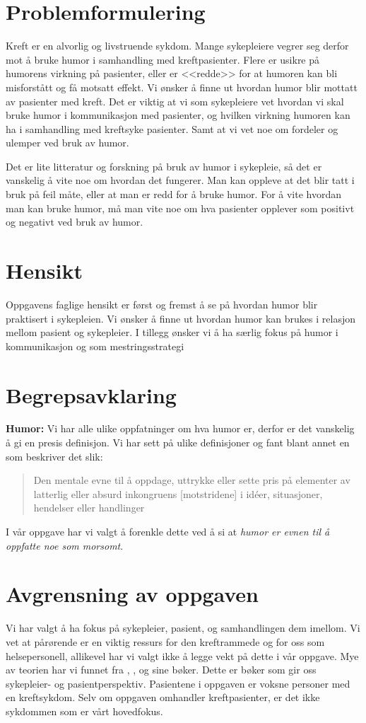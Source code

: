 \section{Problemformulering}

Kreft er en alvorlig og livstruende sykdom. Mange sykepleiere vegrer seg derfor
mot å bruke humor i samhandling med kreftpasienter. Flere er usikre på humorens
virkning på pasienter, eller er <<redde>> for at humoren kan bli misforstått og
få motsatt effekt. Vi ønsker å finne ut hvordan humor blir mottatt av pasienter
med kreft. Det er viktig at vi som sykepleiere vet hvordan vi skal bruke humor
i kommunikasjon med pasienter, og hvilken virkning humoren kan ha i samhandling
med kreftsyke pasienter. Samt at vi vet noe om fordeler og ulemper ved bruk av
humor.

Det er lite litteratur og forskning på bruk av humor i sykepleie, så det er
vanskelig å vite noe om hvordan det fungerer. Man kan oppleve at det blir tatt
i bruk på feil måte, eller at man er redd for å bruke humor. For å vite hvordan
man kan bruke humor, må man vite noe om hva pasienter opplever som positivt og
negativt ved bruk av humor.

\section{Hensikt}

Oppgavens faglige hensikt er først og fremst å se på hvordan humor blir
praktisert i sykepleien. Vi ønsker å finne ut hvordan humor kan brukes i
relasjon mellom pasient og sykepleier. I tillegg ønsker vi å ha særlig fokus på
humor i kommunikasjon og som mestringsstrategi

\section{Begrepsavklaring}

\textbf{Humor:} Vi har alle ulike oppfatninger om hva humor er, derfor er det
vanskelig å gi en presis definisjon. Vi har sett på ulike definisjoner
og fant blant annet en som beskriver det slik:
\blockquote[{}]{Den mentale evne til å oppdage,
uttrykke eller sette pris på elementer av latterlig eller absurd inkongruens
[motstridene] i idéer, situasjoner, hendelser eller handlinger}.  I vår oppgave
har vi valgt å forenkle dette ved å si at \textit{humor er evnen til å oppfatte
noe som morsomt}.

\section{Avgrensning av oppgaven}

Vi har valgt å ha fokus på sykepleier, pasient, og samhandlingen dem imellom.
Vi vet at pårørende er en viktig ressurs for den kreftrammede og for oss som
helsepersonell, allikevel har vi valgt ikke å legge vekt på dette i vår
oppgave. Mye av teorien har vi funnet fra ,
,  og  sine bøker. Dette
er bøker som gir oss sykepleier- og pasientperspektiv. Pasientene i oppgaven er
voksne personer med en kreftsykdom.  Selv om oppgaven omhandler kreftpasienter,
er det ikke sykdommen som er vårt hovedfokus.

